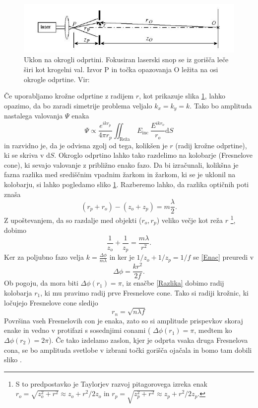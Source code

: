 \documentclass[12pt ]{article}
\begin{document}
\begin{figure}[H]
    \centering
    \includegraphics{Slike/Uklonska.JPG}
    \caption{Uklon na okrogli odprtini. Fokusiran laserski snop se iz gorišča leče širi kot krogelni val. Izvor P in točka opazovanja O ležita na osi okrogle odprtine. Vir: \cite{Praktikum4}}
    \label{Uklon}
\end{figure}
Če uporabljamo krožne odprtine z radijem $r$, kot prikazuje slika \ref{Uklon}, lahko opazimo, da bo zaradi simetrije problema veljalo $k_x=k_y=k$. Tako bo amplituda nastalega valovanja $\Psi$ enaka
\begin{equation}
    \Psi\propto \frac{e^{i k r_p}}{4 \pi r_p}\iint_{\text {Reža }} E_{\text {inc }} \frac{E^{ikr_o}}{r_o}\text{d}S
    \label{Krogelna}
\end{equation}
in razvidno je, da je odvisna zgolj od tega, kolikšen je $r$ (radij krožne odprtine), ki se skriva v $\text{d}S$. Okroglo odprtino lahko tako razdelimo na kolobarje (Fresnelove cone), ki sevajo valovanje z približno enako fazo. Da bi izračunali, kolikšna je fazna razlika med središčnim vpadnim žarkom in žarkom, ki se je uklonil na kolobarju, si lahko pogledamo sliko \ref{Uklon}. Razberemo lahko, da razlika optičnih poti znaša
\begin{equation}
    (r_p+r_o)-(z_o+z_p)=m\frac{\lambda}{2}.
\end{equation}
Z upoštevanjem, da so razdalje med objekti ($r_o,r_p$) veliko večje kot reža $r$ \footnote{S to predpostavko je Taylorjev razvoj pitagorovega izreka enak $r_o=\sqrt{z_o^2+r^2}\approx z_o+r^2/2z_o$ in $r_p=\sqrt{z_p^2+r^2}\approx z_p+r^2/2z_p$.}, dobimo
\begin{equation}
    \frac{1}{z_o}+\frac{1}{z_p}=\frac{m\lambda}{r^2}.
    \label{Enac}
\end{equation}
Ker za poljubno fazo velja $k=\frac{\Delta \phi}{m\lambda}$ in ker je $1/z_o+1/z_p=1/f$ se \eqref{Enac} preuredi v
\begin{equation}
    \Delta\phi=\frac{kr^2}{2f}.
    \label{Razlika}
\end{equation}
Ob pogoju, da mora biti $\Delta\phi(r_1)=\pi$, iz enačbe \eqref{Razlika} dobimo radij kolobarja $r_1$, ki mu pravimo radij prve Fresnelove cone. Tako si radiji krožnic, ki ločujejo Fresnelove cone sledijo 
\begin{equation}
    r_n=\sqrt{n\lambda f}
\end{equation}
Površina vseh Fresnelovih con je enaka, zato so si amplitude prispevkov skoraj enake in vedno v protifazi s sosednjimi conami ( $\Delta\phi(r_1)=\pi$, medtem ko $\Delta\phi(r_2)=2\pi$). Če tako izdelamo zaslon, kjer je odprta vsaka druga Fresnelova cona, se bo amplituda svetlobe v izbrani točki gorišča ojačala in bomo tam dobili sliko \cite{Praktikum3}.
\end{document}
